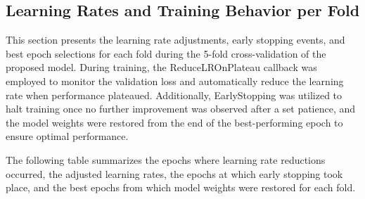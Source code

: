 \vspace{0.5 cm}
\begin{table}[H]
	\centering
	\caption{Per-fold performance metrics (Batch Size: 32, Epochs: 50, Activation Function: ReLU).}
	\label{tab:per-fold}
\end{table}


\vspace{0.75cm}
\begin{minipage}{\linewidth}
	\subsection{Learning Rates and Training Behavior per Fold}
\end{minipage}

This section presents the learning rate adjustments, early stopping events, and best epoch selections for each fold during the 5-fold cross-validation of the proposed model. During training, the ReduceLROnPlateau callback was employed to monitor the validation loss and automatically reduce the learning rate when performance plateaued. Additionally, EarlyStopping was utilized to halt training once no further improvement was observed after a set patience, and the model weights were restored from the end of the best-performing epoch to ensure optimal performance.

The following table summarizes the epochs where learning rate reductions occurred, the adjusted learning rates, the epochs at which early stopping took place, and the best epochs from which model weights were restored for each fold.

